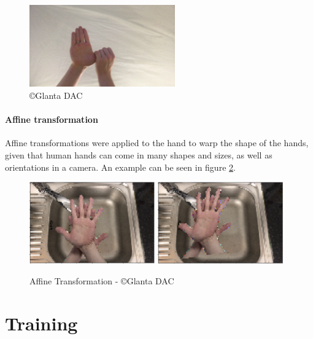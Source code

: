         \begin{figure}[h]
            \centering
            \includegraphics[height=100pt]{../img/flipped_example.png}
            \caption{\copyright \space Glanta DAC}
            \label{fig:flipped_example}
        \end{figure}

        \paragraph{Affine transformation}
        Affine transformations were applied to the hand to warp the shape of the hands, given that human hands can come in many shapes and sizes, as well as orientations in a camera. An example can be seen in figure \ref{fig:affine_example}.

        \begin{figure}[h]
            \centering
            \includegraphics[height=100pt]{../img/affine/0.png}
            \includegraphics[height=100pt]{../img/affine/1.png}
            \caption{Affine Transformation - \copyright \space Glanta DAC}
            \label{fig:affine_example}
        \end{figure}

\section{Training}

